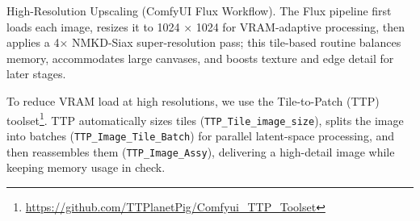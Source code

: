 \documentclass[sigconf,nonacm]{acmart}
\begin{document}
{High-Resolution Upscaling (ComfyUI Flux Workflow).}
The Flux pipeline first loads each image, resizes it to 1024 × 1024 for VRAM-adaptive processing, then applies a 4× NMKD-Siax super-resolution pass; this tile-based routine balances memory, accommodates large canvases, and boosts texture and edge detail for later stages.



To reduce VRAM load at high resolutions, we use the Tile-to-Patch (TTP) toolset\footnote{\url{https://github.com/TTPlanetPig/Comfyui_TTP_Toolset}}. TTP automatically sizes tiles    (\texttt{TTP\_\allowbreak Tile\_\allowbreak image\_\allowbreak size}), splits the image into batches (\texttt{TTP\_Image\_Tile\_Batch}) for parallel latent-space processing, and then reassembles them (\texttt{TTP\_Image\_Assy}), delivering a high-detail image while keeping memory usage in check.
\end{document}
